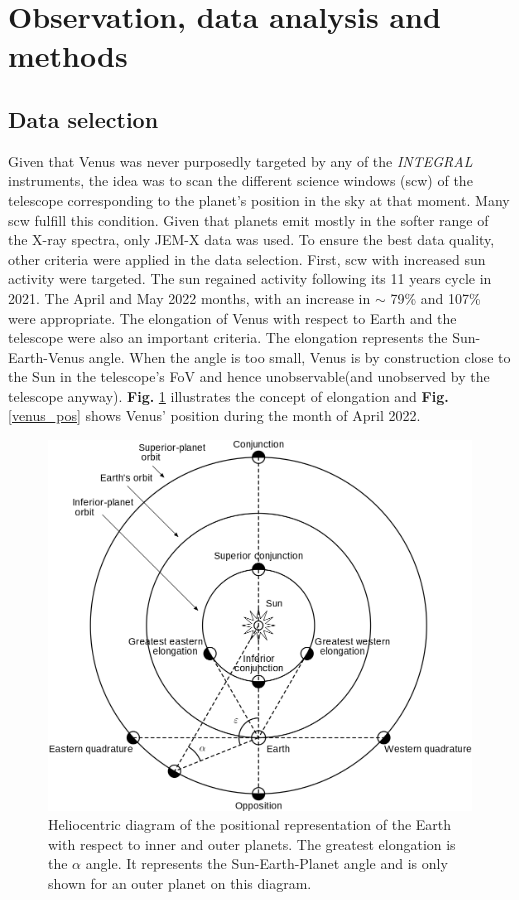\section{Observation, data analysis and methods}

    \subsection{Data selection}
        Given that Venus was never purposedly targeted by any of the \textit{INTEGRAL} instruments, the idea was to scan the different science windows (scw) of the
        telescope corresponding to the planet's position in the sky at that moment. Many scw fulfill this condition. Given that planets emit mostly in the softer range
        of the X-ray spectra, only JEM-X data was used. To ensure the best data quality, other criteria 
        were applied in the data selection. First, scw with increased sun activity were targeted. The sun regained activity following its 11 years cycle in 2021. 
        The April and May 2022 months, with an increase in $\sim$ 79\% and 107\% were appropriate. The elongation of Venus with respect to Earth and the telescope
        were also an important criteria. The elongation represents the Sun-Earth-Venus angle. When the angle is too small, Venus is by construction close to the Sun in the telescope's FoV and hence unobservable(and unobserved by the telescope anyway). \textbf{Fig.} \ref{elongation} illustrates the concept of elongation and \textbf{Fig.} \ref{venus_pos} shows Venus' position during the month of April 2022.

    \begin{figure}[H]
        \centering
        \includegraphics[width = 12cm]{report/Figures/methods/Positional_astronomy.png}
        \caption{Heliocentric diagram of the positional representation of the Earth with respect to inner and outer planets. The greatest elongation is the $\alpha$ angle. It represents the Sun-Earth-Planet angle and is only shown for an outer planet on this diagram.}
        \label{elongation}
    \end{figure}
    
